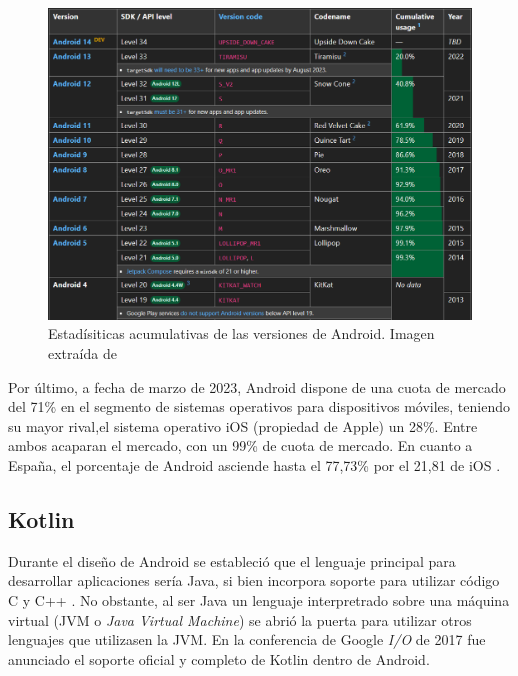         \begin{figure}[H]
            \centering
            \includegraphics[width=1\textwidth]{figures/Android usage.PNG}
            \caption[Estadísiticas acumulativas de las versiones de Android]
            {Estadísiticas acumulativas de las versiones de Android. Imagen extraída de \cite{belinski_android_nodate}}
            \label{figure:android:usage}
        \end{figure}

        Por último, a fecha de marzo de 2023, Android dispone de una cuota de mercado del 71\% en el segmento de sistemas 
        operativos para dispositivos móviles, teniendo su mayor rival,el sistema operativo iOS (propiedad de Apple) 
        un 28\%. Entre ambos acaparan el mercado, con un 99\% de cuota de mercado. En cuanto a España, el 
        porcentaje de Android asciende hasta el 77,73\% por el 21,81 de iOS \cite{press_asi_2023}.

    \subsection{Kotlin}

            Durante el diseño de Android se estableció que el lenguaje principal para desarrollar aplicaciones sería 
            Java, si bien incorpora soporte para utilizar código C y C++ \cite{android_developers_como_nodate}. No
            obstante, al ser Java un lenguaje interpretrado sobre una máquina virtual (JVM o \textit{Java Virtual
            Machine}) se abrió la puerta para  utilizar otros lenguajes que utilizasen la JVM. En la conferencia de 
            Google \textit{I/O} de 2017 fue anunciado el soporte oficial y completo 
            de Kotlin dentro de Android. 

